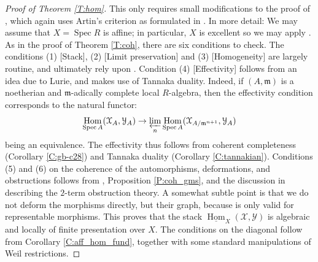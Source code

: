 \documentclass[a4paper]{amsart}
\theoremstyle{plain}
\theoremstyle{definition}
\theoremstyle{remark}
\numberwithin{equation}{section}
\newcommand\cX{\mathcal{X}}
\newcommand\cY{\mathcal{Y}}
\DeclareMathOperator{\Spec}{Spec}
\DeclareMathOperator{\Hom}{Hom}
\begin{document}
\begin{proof}[Proof of Theorem \ref{T:hom}]
  This only requires small modifications to the proof of
  \cite[Thm.~1.2]{hallj_dary_coherent_tannakian_duality}, which again
  uses Artin's criterion as formulated in
  \cite[Thm.~A]{hallj_openness_coh}. In more detail: We may assume
  that $X=\Spec R$ is affine; in particular, $X$ is excellent so we
  may apply \cite[Thm.~A]{hallj_openness_coh}. As in the proof of
  Theorem \ref{T:coh}, there are six conditions to check. The
  conditions (1) [Stack], (2) [Limit preservation] and (3)
  [Homogeneity] are largely routine, and ultimately rely upon
  \cite[\S9]{hallj_openness_coh}. Condition (4) [Effectivity] follows
  from an idea due to Lurie, and makes use of Tannaka
  duality. Indeed, if $(A,\mathfrak{m})$ is a noetherian and
  $\mathfrak{m}$-adically complete local $R$-algebra, then the
  effectivity condition corresponds to the natural functor:
  \[
    \Hom_{\Spec A}(\cX_A,\cY_A) \to \varprojlim_n \Hom_{\Spec
      A}(\cX_{A/\mathfrak{m}^{n+1}}, \cY_{A})
  \]
  being an equivalence. The effectivity thus
  follows from coherent completeness (Corollary \ref{C:gb-c28}) and
  Tannaka duality (Corollary \ref{C:tannakian}). Conditions (5)
  and (6) on the coherence of the automorphisms, deformations, and
  obstructions follows from \cite{olsson-defn}, Proposition
  \ref{P:coh_gms}, and the discussion in
  \cite[\S9]{hallj_openness_coh} describing the $2$-term obstruction
  theory. A somewhat subtle point is that we do not deform the
  morphisms directly, but their graph, because \cite{olsson-defn} is
  only valid for representable morphisms. This proves that the stack
  $\underline{\Hom}_{X}(\cX,\cY)$ is algebraic and locally of finite
  presentation over $X$. The conditions on the diagonal follow from
  Corollary \ref{C:aff_hom_fund}, together with some standard
  manipulations of Weil restrictions.
\end{proof}
\end{document}
